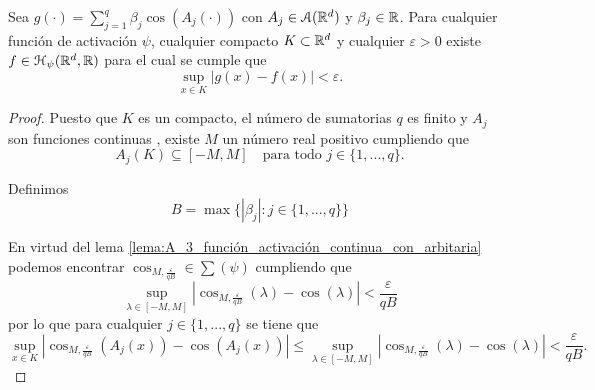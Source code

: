 \begin{lema}\label{lema:A_4_sum_cos_aproxima}
    Sea $g(\cdot) = \sum_{j=1}^q \beta_j \cos(A_j(\cdot))$ con 
    $A_j \in \mathcal{A}(\mathbb{R}^d)$ y $\beta_j \in \mathbb{R}$.
    Para cualquier función de activación $\psi$, 
    cualquier compacto $K \subset \mathbb{R}^d$
    y cualquier $\varepsilon > 0$
    existe $f \in \mathcal{H}_\psi{(\mathbb{R}^d, \mathbb{R})}$ para el cual se cumple que 
    \begin{equation}
        \sup_{x \in K} 
        |g(x) - f(x)| < \varepsilon.
    \end{equation}
\end{lema}
\begin{proof}
    Puesto que $K$ es un compacto, el número de sumatorias $q$
    es finito y $A_j$ son funciones continuas
    , existe
     $M$ un número real positivo  cumpliendo que
    \begin{equation}
        A_j(K) \subseteq [-M, M] 
        \quad 
        \text{para todo } j \in \{1, ..., q \}. 
    \end{equation} 

    Definimos  
    \begin{equation}
        B = \max \{ |\beta_j| :  j \in \{1, ..., q \}\}
    \end{equation}

    En virtud del lema \ref{lema:A_3_función_activación_continua_con_arbitaria}
    podemos encontrar
    $\cos_{M, \frac{\varepsilon}{q B}} \in \sum(\psi)$ cumpliendo que
    \begin{equation}
        \sup_{\lambda \in [-M, M]} | 
        \cos_{M, \frac{\varepsilon}{q B}}(\lambda)
        - 
        \cos(\lambda)
        | 
        < \frac{\varepsilon}{q B} 
    \end{equation}
    por lo que para cualquier  $j \in \{1, ..., q \}$   se tiene que 
    \begin{equation}
        \sup_{x \in K} | 
        \cos_{M, \frac{\varepsilon}{q B}}(A_j(x))
        - 
        \cos(A_j(x))
        | 
        \leq  
        \sup_{\lambda \in [-M, M]} | 
        \cos_{M, \frac{\varepsilon}{q B}}(\lambda)
        - 
        \cos(\lambda)
        | 
        < \frac{\varepsilon}{q B}. 
    \end{equation}


\end{proof}

